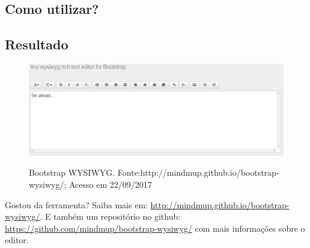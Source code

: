 \documentclass[12pt,a4paper]{article}
\begin{document}
\subsection{Como utilizar?}



\subsection{Resultado}
\begin{figure}[h]
\centering
\includegraphics[width=15cm]{recursos/modelo/Bootstrap.png}
\label{4}
\caption{Bootstrap WYSIWYG. Fonte:http://mindmup.github.io/bootstrap-wysiwyg/; Acesso em 22/09/2017}
\end{figure}

Gostou da ferramenta? Saiba mais em: \url{http://mindmup.github.io/bootstrap-wysiwyg/}. E também um repositório no github: \url{https://github.com/mindmup/bootstrap-wysiwyg/} com mais informações sobre o editor.
\end{document}
